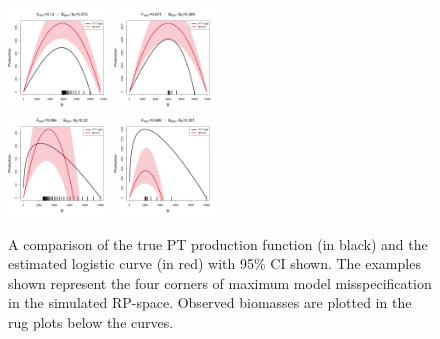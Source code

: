 \documentclass[12pt]{article}
\begin{document}
\begin{figure}
\includegraphics[width=0.24\textwidth]{../ptNew/srrCompareFlatT30X0.12Z0.573.png}
\includegraphics[width=0.24\textwidth]{../ptNew/srrCompareFlatT30X0.674Z0.599.png}\\
\includegraphics[width=0.24\textwidth]{../ptNew/srrCompareFlatT30X0.096Z0.22.png}
\includegraphics[width=0.24\textwidth]{../ptNew/srrCompareFlatT30X0.699Z0.201.png}
\caption{
A comparison of the true PT production function (in black) and the estimated logistic curve (in red)
with 95\% CI shown. The examples shown represent the four corners of maximum model misspecification
in the simulated RP-space. Observed biomasses are plotted in the rug plots below the curves.
}
\label{flatProd}
\end{figure}
\end{document}
